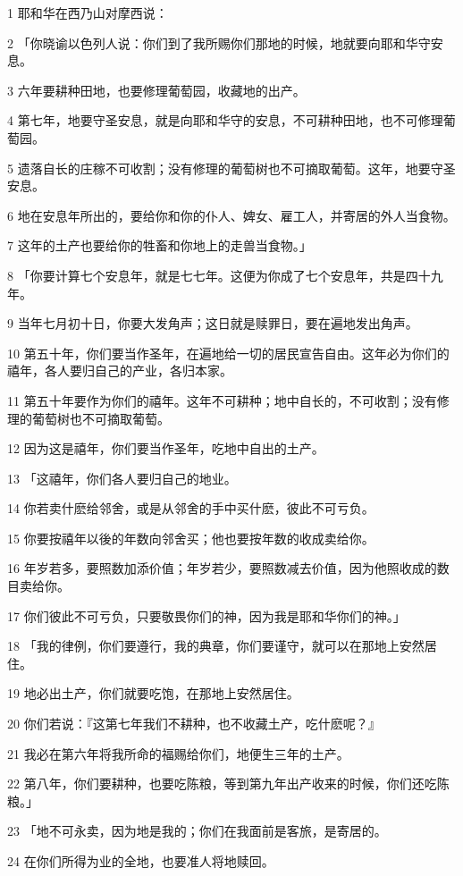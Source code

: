 \par 1 耶和华在西乃山对摩西说：
\par 2 「你晓谕以色列人说：你们到了我所赐你们那地的时候，地就要向耶和华守安息。
\par 3 六年要耕种田地，也要修理葡萄园，收藏地的出产。
\par 4 第七年，地要守圣安息，就是向耶和华守的安息，不可耕种田地，也不可修理葡萄园。
\par 5 遗落自长的庄稼不可收割；没有修理的葡萄树也不可摘取葡萄。这年，地要守圣安息。
\par 6 地在安息年所出的，要给你和你的仆人、婢女、雇工人，并寄居的外人当食物。
\par 7 这年的土产也要给你的牲畜和你地上的走兽当食物。」
\par 8 「你要计算七个安息年，就是七七年。这便为你成了七个安息年，共是四十九年。
\par 9 当年七月初十日，你要大发角声；这日就是赎罪日，要在遍地发出角声。
\par 10 第五十年，你们要当作圣年，在遍地给一切的居民宣告自由。这年必为你们的禧年，各人要归自己的产业，各归本家。
\par 11 第五十年要作为你们的禧年。这年不可耕种；地中自长的，不可收割；没有修理的葡萄树也不可摘取葡萄。
\par 12 因为这是禧年，你们要当作圣年，吃地中自出的土产。
\par 13 「这禧年，你们各人要归自己的地业。
\par 14 你若卖什麽给邻舍，或是从邻舍的手中买什麽，彼此不可亏负。
\par 15 你要按禧年以後的年数向邻舍买；他也要按年数的收成卖给你。
\par 16 年岁若多，要照数加添价值；年岁若少，要照数减去价值，因为他照收成的数目卖给你。
\par 17 你们彼此不可亏负，只要敬畏你们的神，因为我是耶和华你们的神。」
\par 18 「我的律例，你们要遵行，我的典章，你们要谨守，就可以在那地上安然居住。
\par 19 地必出土产，你们就要吃饱，在那地上安然居住。
\par 20 你们若说：『这第七年我们不耕种，也不收藏土产，吃什麽呢？』
\par 21 我必在第六年将我所命的福赐给你们，地便生三年的土产。
\par 22 第八年，你们要耕种，也要吃陈粮，等到第九年出产收来的时候，你们还吃陈粮。」
\par 23 「地不可永卖，因为地是我的；你们在我面前是客旅，是寄居的。
\par 24 在你们所得为业的全地，也要准人将地赎回。
